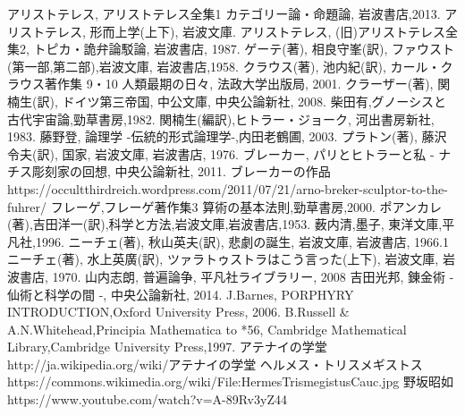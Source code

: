 \begin{thebibliography}{99}
アリストテレス, アリストテレス全集1 カテゴリー論・命題論, 岩波書店,2013.
アリストテレス, 形而上学(上下), 岩波文庫.
アリストテレス, (旧)アリストテレス全集2, トピカ・詭弁論駁論, 岩波書店, 1987.
ゲーテ(著), 相良守峯(訳), ファウスト(第一部,第二部),岩波文庫, 岩波書店,1958.
クラウス(著), 池内紀(訳), 
カール・クラウス著作集 9・10 人類最期の日々, 法政大学出版局, 2001.
クラーザー(著), 関楠生(訳), ドイツ第三帝国, 中公文庫, 中央公論新社, 2008.
柴田有,グノーシスと古代宇宙論,勁草書房,1982.
関楠生(編訳),ヒトラー・ジョーク, 河出書房新社, 1983.
藤野登, 論理学 -伝統的形式論理学-,内田老鶴圃, 2003.
プラトン(著), 藤沢 令夫(訳), 国家, 岩波文庫, 岩波書店, 1976.
ブレーカー, パリとヒトラーと私 - ナチス彫刻家の回想, 中央公論新社, 2011.
ブレーカーの作品\\
https://occultthirdreich.wordpress.com/2011/07/21/arno-breker-sculptor-to-the-fuhrer/
フレーゲ,フレーゲ著作集3 算術の基本法則,勁草書房,2000.
ポアンカレ(著),吉田洋一(訳),科学と方法,岩波文庫,岩波書店,1953. 
薮内清,墨子, 東洋文庫,平凡社,1996.
ニーチェ(著), 秋山英夫(訳), 悲劇の誕生, 岩波文庫, 岩波書店, 1966.1
ニーチェ(著), 水上英廣(訳), ツァラトゥストラはこう言った(上下), 
岩波文庫, 岩波書店, 1970.
山内志朗, 普遍論争, 平凡社ライブラリー, 2008
吉田光邦, 錬金術 - 仙術と科学の間 -, 中央公論新社, 2014.
J.Barnes, PORPHYRY INTRODUCTION,Oxford University Press, 2006.
B.Russell \& A.N.Whitehead,Principia Mathematica to *56,
Cambridge Mathematical Library,Cambridge University Press,1997.
アテナイの学堂\\ 
http://ja.wikipedia.org/wiki/アテナイの学堂
ヘルメス・トリスメギストス\\
https://commons.wikimedia.org/wiki/File:HermesTrismegistusCauc.jpg
野坂昭如
https://www.youtube.com/watch?v=A-89Rv3yZ44
\end{thebibliography}






